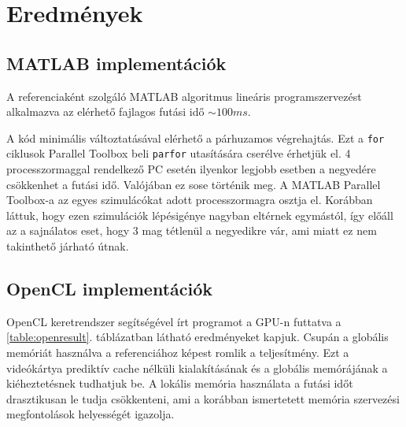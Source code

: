  \section{Eredmények}
 	
	\subsection{MATLAB implementációk}
	A referenciaként szolgáló MATLAB algoritmus lineáris programszervezést
	alkalmazva az elérhető fajlagos futási idő $\sim100 ms$.
	
	A kód minimális változtatásával elérhető a párhuzamos végrehajtás. Ezt a
	\texttt{for} ciklusok Parallel Toolbox beli \texttt{parfor} utasítására
	cserélve érhetjük el. 4 processzormaggal rendelkező PC esetén ilyenkor
	legjobb esetben a negyedére csökkenhet a futási idő. Valójában ez sose történik meg.
	A MATLAB Parallel Toolbox-a az egyes szimulácókat adott processzormagra osztja el.
	Korábban láttuk, hogy ezen szimulációk lépésigénye nagyban eltérnek egymástól, így előáll az a
	sajnálatos eset, hogy 3 mag tétlenül a negyedikre vár, ami miatt ez nem takinthető járható útnak. 
	
	\subsection{OpenCL implementációk}
	OpenCL keretrendszer segítségével írt programot a GPU-n futtatva a
	\ref{table:openresult}. táblázatban látható eredményeket kapjuk.
	Csupán a globális memóriát használva a referenciához képest romlik a
	teljesítmény. Ezt a videókártya prediktív cache nélküli kialakításának és a
	globális memórájának a kiéheztetésnek tudhatjuk be.
	A lokális memória használata a futási időt drasztikusan le tudja
	csökkenteni, ami a korábban ismertetett memória szervezési megfontolások
	helyességét igazolja.
	
	
	
	
	
